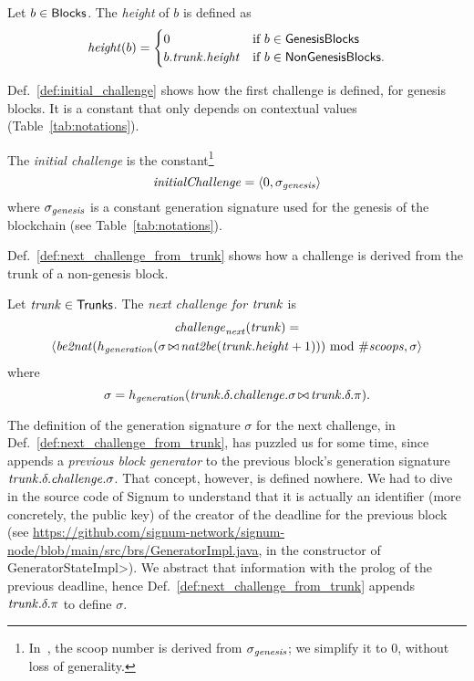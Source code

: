 \begin{definition}\label{def:block_height}
  Let $b\in{\mathsf{Blocks}}$. The \emph{height} of $b$ is defined as
  \[
  {\mathit{height}}(b)=\begin{cases}
  0 & \text{if $b\in{\mathsf{GenesisBlocks}}$}\\
  b.{\mathit{trunk}}.{\mathit{height}} & \text{if $b\in{\mathsf{NonGenesisBlocks}}$.}
  \end{cases}
  \]
\end{definition}
%
Def.~\ref{def:initial_challenge} shows how the first challenge is defined, for genesis blocks.
It is a constant that only depends on contextual values (Table~\ref{tab:notations}).
%
\begin{definition}[$\initialchallenge$]\label{def:initial_challenge}
  The \emph{initial challenge} is the constant\footnote{In~\cite{SignumPlotting},
  the scoop number is derived from $\sigma_{\mathit{genesis}}$; we simplify it to $0$, without loss
  of generality.}
  \[
    {\mathit{initialChallenge}}=
    \langle 0,\sigma_{\mathit{genesis}}\rangle
  \]
  where $\sigma_{\mathit{genesis}}$ is a constant generation signature used for the genesis of the blockchain
  (see Table~\ref{tab:notations}).
\end{definition}
%
Def.~\ref{def:next_challenge_from_trunk}
shows how a challenge is derived from the trunk of a non-genesis block.
%
\begin{definition}[$\nextchallenge(\trunk)$]\label{def:next_challenge_from_trunk}
  Let ${\mathit{trunk}}\in{\mathsf{Trunks}}$. The \emph{next challenge for ${\mathit{trunk}}$} is
  \begin{multline*}
    {\mathit{challenge}}_{\mathit{next}}({\mathit{trunk}})=\\
    \langle{\mathit{be2nat}}(h_{\mathit{generation}}(\sigma\operatorname*{\bowtie}{\mathit{nat2be}}({\mathit{trunk}}.{\mathit{height}}+1)))\text{ mod }{\#\mathit{scoops}},\sigma\rangle
  \end{multline*}
  where
  \[
  \sigma=h_{\mathit{generation}}({\mathit{trunk}}.\delta.{\mathit{challenge}}.\sigma\operatorname*{\bowtie}{\mathit{trunk}}.\delta.\pi).  
  \]
\end{definition}
%
The definition of the generation signature $\sigma$ for the next challenge,
in Def.~\ref{def:next_challenge_from_trunk},
has puzzled us for some time, since~\cite{SignumPlotting} appends a \emph{previous block generator}
to the previous block's generation signature ${\mathit{trunk}}.\delta.{\mathit{challenge}}.\sigma$.
That concept, however, is defined nowhere.
We had to dive in the source code of Signum to understand that it is actually
an identifier (more concretely, the public key)
of the creator of the deadline for the previous block
(see \url{https://github.com/signum-network/signum-node/blob/main/src/brs/GeneratorImpl.java},
in the constructor of \<GeneratorStateImpl>).
We abstract that information with the prolog of the previous deadline, hence
Def.~\ref{def:next_challenge_from_trunk} appends ${\mathit{trunk}}.\delta.\pi$ to define $\sigma$.

